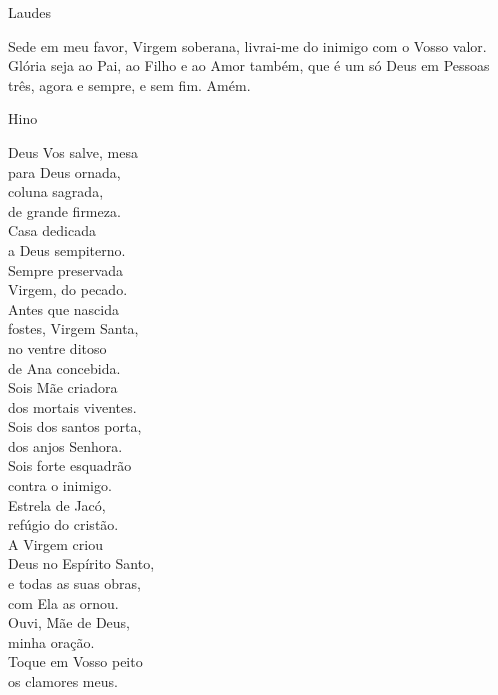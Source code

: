 \documentclass{book}
\begin{document}
\begin{center}
    Laudes
\end{center}
\begin{flushleft}
    Sede em meu favor, Virgem soberana, livrai-me do inimigo com o Vosso valor. Glória seja ao Pai, ao Filho e ao Amor também, que é um só Deus em Pessoas três, agora e sempre, e sem fim. Amém.
\end{flushleft}
\begin{center}
    \textcolor{VioletRed2}{Hino}
\end{center}
\begin{multicols}{2}
    Deus Vos salve, mesa \\
    para Deus ornada, \\
    coluna sagrada, \\
    de grande firmeza.
    \vspace{.2cm} \\
    Casa dedicada \\
    a Deus sempiterno. \\
    Sempre preservada \\
    Virgem, do pecado.
    \vspace{.2cm} \\
    Antes que nascida \\
    fostes, Virgem Santa, \\
    no ventre ditoso \\
    de Ana concebida.
    \vspace{.2cm} \\
    Sois Mãe criadora \\
    dos mortais viventes. \\
    Sois dos santos porta, \\
    dos anjos Senhora.
    \vspace{.2cm} \\
    Sois forte esquadrão \\
    contra o inimigo. \\
    Estrela de Jacó, \\
    refúgio do cristão.
    \vspace{.2cm} \\
    A Virgem criou \\
    Deus no Espírito Santo, \\
    e todas as suas obras, \\
    com Ela as ornou.
    \vspace{.2cm} \\
    Ouvi, Mãe de Deus, \\
    minha oração. \\
    Toque em Vosso peito \\
    os clamores meus.
\end{multicols}
\end{document}

